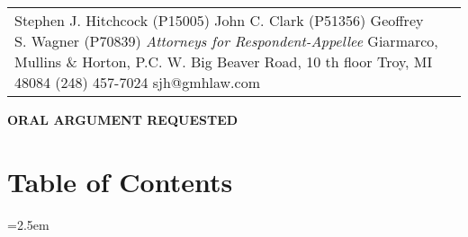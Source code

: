 \documentclass[12pt,\documentclassflag]{michiganCourtOfAppealsBrief}
\begin{document}
\begin{centering}
\begin{tabular}{p{} p{}}
{  Stephen J. Hitchcock (P15005)\newline
  John C. Clark (P51356) \newline
  Geoffrey S. Wagner (P70839)\newline
  \emph{Attorneys for Respondent-Appellee}\newline
Giarmarco, Mullins \& Horton, P.C.\newline
101 W. Big Beaver Road, 10 th floor\newline
Troy, MI 48084\newline
(248) 457-7024\newline
sjh@gmhlaw.com\newline
~}
\end{tabular}
\makeandletter
\par\vspace{\baselineskip}\vspace{\baselineskip}\vspace{\baselineskip}

\textbf{ORAL ARGUMENT REQUESTED}


\end{centering}

\pagestyle{romanparen}


\newpage 

\section*{Table of Contents}

\tableofcontents


\newpage
\tableofauthorities


\parindent=2.5em
\doublespacing



\end{document}
